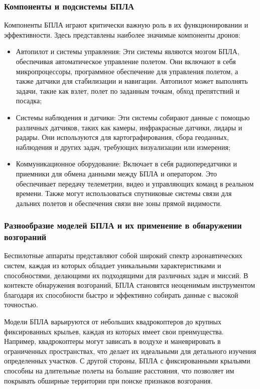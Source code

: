 \subsubsection{Компоненты и подсистемы БПЛА}
Компоненты БПЛА играют критически важную роль в их функционировании и эффективности. Здесь представлены наиболее значимые компоненты дронов:
\begin{itemize}
	\item Автопилот и системы управления: Эти системы являются мозгом БПЛА, обеспечивая автоматическое управление полетом. Они включают в себя микропроцессоры, программное обеспечение для управления полетом, а также датчики для стабилизации и навигации. Автопилот может выполнять задачи, такие как взлет, полет по заданным точкам, обход препятствий и посадка;
	\item Системы наблюдения и датчики: Эти системы собирают данные с помощью различных датчиков, таких как камеры, инфракрасные датчики, лидары и радары. Они используются для картографирования, сбора геоданных, наблюдения и других задач, требующих визуализации или измерения;
	\item Коммуникационное оборудование: Включает в себя радиопередатчики и приемники для обмена данными между БПЛА и оператором. Это обеспечивает передачу телеметрии, видео и управляющих команд в реальном времени. Также могут использоваться спутниковые системы связи для дальних полетов и обеспечения связи вне зоны прямой видимости.
\end{itemize}

\subsubsection{Разнообразие моделей БПЛА и их применение в обнаружении возгораний}
Беспилотные аппараты представляют собой широкий спектр аэронавтических систем, каждая из которых обладает уникальными характеристиками и способностями, делающими их подходящими для различных задач и миссий. В контексте обнаружения возгораний, БПЛА становятся неоценимым инструментом благодаря их способности быстро и эффективно собирать данные с высокой точностью.

Модели БПЛА варьируются от небольших квадрокоптеров до крупных фиксированных крыльев, каждая из которых имеет свои преимущества. Например, квадрокоптеры могут зависать в воздухе и маневрировать в ограниченных пространствах, что делает их идеальными для детального изучения определенных участков. С другой стороны, БПЛА с фиксированными крыльями способны на длительные полеты на большие расстояния, что позволяет им покрывать обширные территории при поиске признаков возгорания.

